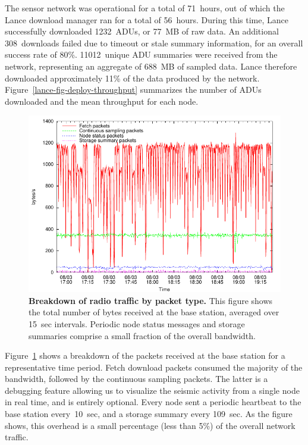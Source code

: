 The sensor network was operational for a total of 71~hours, out of
which the Lance download manager ran for a total of 56~hours. 
During this time, Lance successfully downloaded 1232~ADUs, or 77~MB of 
raw data. An additional 308~downloads failed due to timeout or stale summary 
information, for an overall success rate of 80\%. 
11012~unique ADU summaries were received from the network,
representing an aggregate of 688~MB of sampled data. Lance therefore
downloaded approximately 11\% of the data produced by the network.
Figure~\ref{lance-fig-deploy-throughput} summarizes the number of ADUs
downloaded and the mean throughput for each node. 


\begin{figure}[t]
\label{lance-fig-packetgraph}
\begin{center}
\includegraphics[width=0.9\hsize]{./4-lance/figs/deploy/packetgraph/packetgraph.pdf}
\end{center}
\caption{\textbf{Breakdown of radio traffic by packet type.}
This figure shows the total number of bytes received at the base station,
averaged over 15~sec intervals. Periodic node status messages and storage
summaries comprise a small fraction of the overall bandwidth.}
\end{figure}

Figure~\ref{lance-fig-packetgraph} shows a breakdown of the packets received
at the base station for a representative time period.
Fetch download packets consumed the majority of
the bandwidth, followed by the continuous sampling packets.
The latter is a debugging feature allowing us to visualize the
seismic activity from a single node in real time, and is entirely optional.
Every node sent a periodic heartbeat to the base station every~10~sec,
and a storage summary every 109~sec. As the figure shows, this
overhead is a small percentage (less than 5\%) of the overall network
traffic. 

